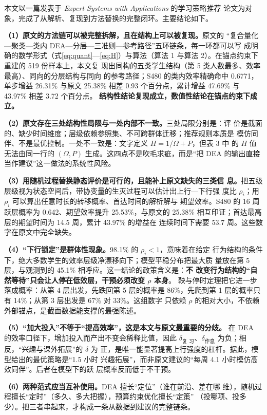 本文以一篇发表于 \textit{Expert Systems with Applications} 的学习策略推荐
论文为对象，完成了从解析、复现到方法替换的完整闭环。主要结论如下。

\textbf{（1）原文的方法链可以被完整拆解，且在结构上可以被复现。}原文的
“复合量化—聚类—类内 DEA—分层—三准则—参考路径”五环链条，每一环都可以写
成明确的数学形式（式\eqref{eq:quant}—\eqref{eq:H}）与算法（算法 1 与算法
2）。在锚点约束下重建的 519 份样本上，本文复
现出同构的五类学生结构（第 5 类人数最多、效率最高）、同向的分层结构与同向
的参考路径；S480 的类内效率精确命中 0.6771，单步增益 26.31\% 与原文
25.38\% 相差 0.93 个百分点，累计增益 47.69\% 与 43.97\% 相差 3.72 个百分点。
\textbf{结构性结论复现成立，数值性结论在锚点约束下成立。}

\textbf{（2）原文存在三处结构性局限与一处内部不一致。}三处局限分别是：评
价是截面的、缺少时间维度；层级依赖参照集、不可跨群体迁移；推荐规则本质是
模仿同伴、不是最优控制。一处不一致是：文字定义 $H=1/\Omega+P$，但表 3 中
的 $H$ 值无法由同一行的 $(\Omega,P)$ 生成。这四点不是吹毛求疵，而是“把
DEA 的输出直接当作建议”这一做法的系统性风险。

\textbf{（3）用随机过程替换静态评价是可行的，且能补上原文缺失的三类信
息。}把五级层级视为状态空间后，带协变量的生灭过程可以估计出上行—下行强
度比 $\rho_i$；用 $\rho_i$ 可以算出任意时长的转移概率、首达时间的解析解与
期望效率。S480 的 16 周跃层概率为 0.642、期望效率提升 25.53\%，与原文的
25.38\% 相互印证；首达最高层的期望时间为 14.5 周，累计 43.97\% 的增益在
连续时间下需要 53.7 周。这些数字在原文中完全缺失。

\textbf{（4）“下行锁定”是群体性现象。}98.1\% 的 $\rho_i<1$，意味着在给定
行为结构的条件下，绝大多数学生的效率层级净漂移向下；模型平稳分布把最大质
量放在第 5 层，与观测到的 45.1\% 相呼应。这一结论的政策含义是：\textbf{不
改变行为结构的“自然等待”只会让人停在低效层，干预必须改变 $\rho$ 本身}。
鞅与停时定理把它进一步落成概率：从第 4 层出发，先跌回第 5 层的概率是
86\%，先爬到第 1 层的概率只有 14\%；从第 3 层出发是 67\% 对 33\%。这组数字
只依赖 $\rho$ 的相对大小，不依赖外部锚点，是截面数据能支撑的最强陈述。

\textbf{（5）“加大投入”不等于“提高效率”，这是本文与原文最重要的分歧。}
在 DEA 的效率口径下，增加投入而产出不变会稀释比值，因此 $\delta_{\text{复
习}}$、$\delta_{\text{作息}}$ 为负；相反，“兴趣与课外拓展”的 $\delta$ 为
正，是唯一能显著提高上行强度的杠杆。据此，模型给出的最优策略是“1.5 小时
兴趣拓展”，而非原文建议的“每周 4.1 小时模仿高效同伴”。后者在模型下的跃
层概率反而低于不干预。

\textbf{（6）两种范式应当互补使用。}DEA 擅长“定位”（谁在前沿、差在哪
维），随机过程擅长“定时”（多久、多大把握），预算约束优化擅长“定策”
（投哪项、投多少）。把三者串起来，才构成一条从数据到建议的完整链条。

